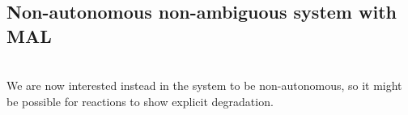 \documentclass{article}
\begin{document}
\subsection{Non-autonomous non-ambiguous system with MAL}
\\
We are now interested instead in the system to be non-autonomous, so it might be possible for reactions to show explicit degradation.

\end{document}
